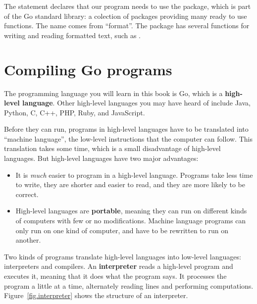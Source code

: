 
The  statement declares that our program needs to use the  package, which is part of the Go standard library: a colection of packages providing many ready to use functions. The  name comes from ``format''. The  package has several functions for writing and reading formatted text, such as .


\section{Compiling Go programs}


The programming language you will learn in this book is Go, which is a {\bf high-level language}.
Other high-level languages you may have heard of include Java, Python, C, C++, PHP, Ruby, and JavaScript.


Before they can run, programs in high-level languages have to be translated into ``machine language'', the low-level instructions that the computer can follow.
This translation takes some time, which is a small disadvantage of high-level languages.
But high-level languages have two major advantages:

\begin{itemize}

\item It is {\em much} easier to program in a high-level language.
Programs take less time to write, they are shorter and easier to read, and they are more likely to be correct.


\item High-level languages are {\bf portable}, meaning they can run on different kinds of computers with few or no modifications.
Machine language programs can only run on one kind of computer, and have to be rewritten to run on another.

\end{itemize}


Two kinds of programs translate high-level languages into low-level languages: interpreters and compilers.
An {\bf interpreter} reads a high-level program and executes it, meaning that it does what the program says.
It processes the program a little at a time, alternately reading lines and performing computations.
Figure~\ref{fig.interpreter} shows the structure of an interpreter.

